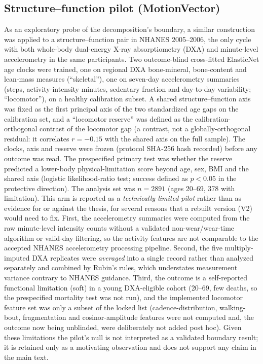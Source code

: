 \documentclass[11pt]{article}
\begin{document}
\subsection{Structure--function pilot (MotionVector)}
As an exploratory probe of the decomposition's boundary, a similar
construction was applied to a structure--function pair in NHANES 2005--2006, the only cycle with
both whole-body dual-energy X-ray absorptiometry (DXA) and minute-level accelerometry
in the same participants. Two outcome-blind cross-fitted ElasticNet age clocks were
trained, one on regional DXA bone-mineral, bone-content and lean-mass measures
(``skeletal''), one on seven-day accelerometry summaries (steps, activity-intensity
minutes, sedentary fraction and day-to-day variability; ``locomotor''), on a healthy
calibration subset. A shared structure--function axis was fixed as the first principal
axis of the two standardized age gaps on the calibration set, and a ``locomotor reserve''
was defined as the calibration-orthogonal contrast of the locomotor gap (a contrast, not
a globally-orthogonal residual: it correlates $r=-\num{0.15}$ with the shared axis on the
full sample). The clocks, axis and reserve were frozen (protocol SHA-256 hash recorded)
before any outcome was read. The prespecified primary test was whether the reserve
predicted a lower-body physical-limitation score beyond age, sex, BMI and the shared axis
(logistic likelihood-ratio test; success defined as $p<\num{0.05}$ in the protective
direction). The analysis set was $n=\num{2891}$ (ages 20--69, \num{378} with limitation).
This arm is reported as a \emph{technically limited pilot} rather than as evidence for or
against the thesis, for several reasons that a rebuilt version (V2) would need to fix.
First, the accelerometry summaries were computed from the raw minute-level intensity
counts without a validated non-wear/wear-time algorithm or valid-day filtering, so the
activity features are not comparable to the accepted NHANES accelerometry processing
pipeline. Second, the five multiply-imputed DXA replicates were \emph{averaged} into a
single record rather than analyzed separately and combined by Rubin's rules, which
understates measurement variance contrary to NHANES guidance. Third, the outcome is a
self-reported functional limitation (soft) in a young DXA-eligible cohort (20--69, few
deaths, so the prespecified mortality test was not run), and the implemented locomotor
feature set was only a subset of the locked list (cadence-distribution, walking-bout,
fragmentation and cosinor-amplitude features were not computed and, the outcome now being
unblinded, were deliberately not added post hoc). Given these limitations the pilot's
null is not interpreted as a validated boundary result; it is retained only as a
motivating observation and does not support any claim in the main text.
\end{document}
